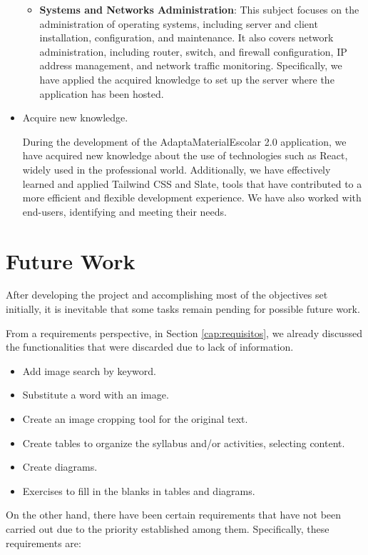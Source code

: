 \begin{itemize}
\begin{itemize}
        \item \textbf{Systems and Networks Administration}: This subject focuses on the administration of operating systems, including server and client installation, configuration, and maintenance. It also covers network administration, including router, switch, and firewall configuration, IP address management, and network traffic monitoring. Specifically, we have applied the acquired knowledge to set up the server where the application has been hosted.
    \end{itemize}

    \item Acquire new knowledge.

    During the development of the AdaptaMaterialEscolar 2.0 application, we have acquired new knowledge about the use of technologies such as React, widely used in the professional world. Additionally, we have effectively learned and applied Tailwind CSS and Slate, tools that have contributed to a more efficient and flexible development experience. We have also worked with end-users, identifying and meeting their needs.
\end{itemize}


\section{Future Work}
\label{sec:FutureWork}
After developing the project and accomplishing most of the objectives set initially, it is inevitable that some tasks remain pending for possible future work.

From a requirements perspective, in Section \ref{cap:requisitos}, we already discussed the functionalities that were discarded due to lack of information.

\begin{itemize}
    \item Add image search by keyword.
    \item Substitute a word with an image.
    \item Create an image cropping tool for the original text.
    \item Create tables to organize the syllabus and/or activities, selecting content.
    \item Create diagrams.
    \item Exercises to fill in the blanks in tables and diagrams.
\end{itemize}

On the other hand, there have been certain requirements that have not been carried out due to the priority established among them. Specifically, these requirements are:

